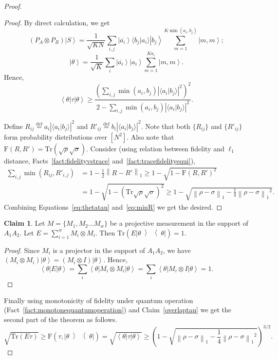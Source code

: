 \documentclass[11pt,a4paper]{article}
\def\F{\mathrn{F}}
\theoremstyle{plain}
\theoremstyle{definition}
\newtheorem{claim}[theorem]{Claim}
\newcommand {\defeq} {\ensuremath{ \stackrel{\mathrm{def}}{=} }}
\newcommand {\abs} [1] {\ensuremath{ \left| #1 \right| }}
\newcommand {\norm} [1] {\ensuremath{ \left\| #1 \right\| }}
\newcommand {\normsub} [2] {\ensuremath{ \norm{#1}_{#2} }}
\newcommand {\onenorm} [1] {\normsub{#1}{1}}
\newcommand {\bra} [1] {\ensuremath{ \left\langle #1 \right| }}
\newcommand {\ket} [1] {\ensuremath{ \left| #1 \right\rangle }}
\newcommand {\ketbratwo} [2] {\ensuremath{ \left| #1 \middle\rangle \middle\langle #2 \right| }}
\newcommand {\ketbra} [1] {\ketbratwo{#1}{#1}}
\newcommand {\Tr} {\ensuremath{ \mathrm{Tr} }}
\newcommand {\myqedhere} {\tag*{\qedhere}}
\def\F{\mathrm{F}}
\newcommand{\conjugate}[1]{\overline{#1}}
\newcommand{\braket}[2]{\langle#1|#2\rangle}
\begin{document}
\begin{proof}
\begin{proof}
By direct calculation, we get 
$$(P_A\otimes P_B)\ket{S}=\frac{1}{\sqrt{KN}}\sum_{i,j}\ket{\conjugate{a_i}}\braket{b_j}{a_i}\ket{b_j}\sum_{m=1}^{K\min(a_i,b_j)}\ket{m,m} ;$$ 
$$\ket{\theta}=\frac{1}{\sqrt{K}}\sum_i\ket{\conjugate{a_i}}\ket{a_i}\sum_{m=1}^{Ka_i}\ket{m,m} .$$ 
Hence,
\begin{equation} \label{eq:thetatau}\bra{\theta}\tau\ket{\theta} \geq \frac{\left(\sum_{i,j}\min(a_i,b_j) \abs{\braket{a_i}{b_j}}^2\right)^2}{2-\sum_{i,j}\min(a_i,b_j) \abs{\braket{a_i}{b_j}}^2} .
\end{equation}

Define $R_{ij}\defeq a_i \abs{\braket{a_i}{b_j}}^2$ and $R'_{ij}\defeq b_i \abs{\braket{a_i}{b_j}}^2$. Note that both $\{R_{ij}\}$ and $\{R'_{ij}\}$ form probability distributions over $[N^2]$. Also note that $\F(R,R') = \Tr(\sqrt{\rho}\sqrt{\sigma})$. Consider (using relation between fidelity and $\ell_1$ distance, Facts~\ref{fact:fidelityvstrace} and~\ref{fact:tracefidelityequi}),
\begin{align}
 \sum_{i,j}\min(R_{ij},R'_{i,j}) & = 1 - \frac{1}{2}\onenorm{R-R'}  \geq 1 - \sqrt{1-\F(R,R')^2} \nonumber \\
 &= 1 - \sqrt{1-(\Tr \sqrt{\rho}\sqrt{\sigma})^2}  \geq  1-\sqrt{\onenorm{\rho-\sigma} - \frac{1}{4}\onenorm{\rho-\sigma}^2} \label{eq:minR}. 
  \end{align}
  Combining Equations~\eqref{eq:thetatau} and~\eqref{eq:minR} we get the desired.
\end{proof}


\begin{claim}
Let $M=\{M_1,M_2\ldots M_w\}$ be a projective measurement  in the support of $A_1A_2$. Let $E=\sum_{i=1}^w M_i\otimes M_i$. Then $\Tr (E \ketbra{\theta}) = 1$.
\end{claim}

\begin{proof}
Since $M_i$ is a projector in the support of $A_1A_2$, we have $(M_i\otimes M_i)\ket{\theta} = (M_i\otimes I)\ket{\theta}$. Hence, \[\bra{\theta}E\ket{\theta}=\sum_i\bra{\theta}M_i\otimes M_i\ket{\theta} = \sum_i\bra{\theta}M_i\otimes I\ket{\theta} = 1 . \myqedhere \]
\end{proof}
Finally  using monotonicity of fidelity under quantum operation (Fact~\ref{fact:monotonequantumoperation}) and Claim~\ref{overlaptau} we get the second part of the theorem as follows. 
\[\sqrt{\Tr (E\tau)} \geq  \F(\tau , \ketbra{\theta}) = \sqrt{\bra{\theta}\tau\ket{\theta}} \geq \left(1-\sqrt{\onenorm{\rho-\sigma} - \frac{1}{4}\onenorm{\rho-\sigma}^2}\right)^{3/2} . \myqedhere \]

\end{proof}
\end{document}
